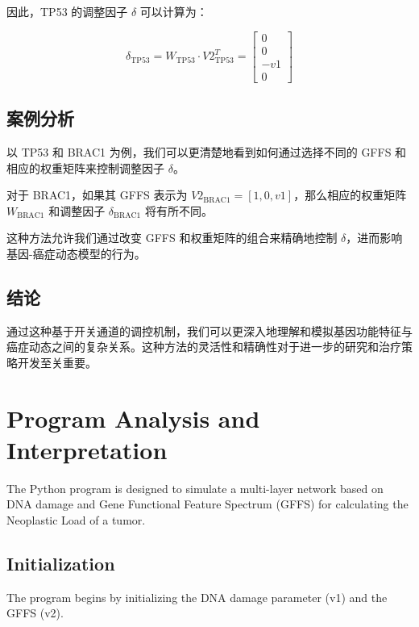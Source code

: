 \documentclass{article}
\begin{document}
因此，TP53 的调整因子 $\delta$ 可以计算为：

\begin{equation}
    \delta_{\text{TP53}} = W_{\text{TP53}} \cdot V2_{\text{TP53}}^T = \begin{bmatrix}
    0 \\
    0 \\
    -v1 \\
    0
    \end{bmatrix}
\end{equation}

\subsection{案例分析}

以 TP53 和 BRAC1 为例，我们可以更清楚地看到如何通过选择不同的 GFFS 和相应的权重矩阵来控制调整因子 $\delta$。

对于 BRAC1，如果其 GFFS 表示为 $V2_{\text{BRAC1}} = [1,0,v1]$，那么相应的权重矩阵 $W_{\text{BRAC1}}$ 和调整因子 $\delta_{\text{BRAC1}}$ 将有所不同。

这种方法允许我们通过改变 GFFS 和权重矩阵的组合来精确地控制 $\delta$，进而影响基因-癌症动态模型的行为。

\subsection{结论}

通过这种基于开关通道的调控机制，我们可以更深入地理解和模拟基因功能特征与癌症动态之间的复杂关系。这种方法的灵活性和精确性对于进一步的研究和治疗策略开发至关重要。





\section{Program Analysis and Interpretation}

The Python program is designed to simulate a multi-layer network based on DNA damage and Gene Functional Feature Spectrum (GFFS) for calculating the Neoplastic Load of a tumor.

\subsection{Initialization}

The program begins by initializing the DNA damage parameter (v1) and the GFFS (v2). 
\end{document}
